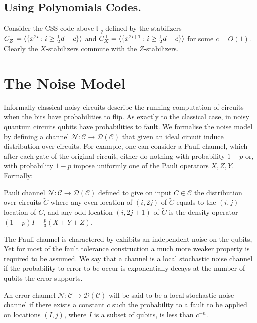 \documentclass[manuscript,screen,review]{acmart}
\begin{document}
{\subsection{Using Polynomials Codes.} Consider the CSS code above $\mathbb{F}_{q}$ defined by the stabilizers $C_{Z}^{\perp} = \braket{\{ x^{2i} : i\ge \frac{1}{2}d - c \}}$ and $C_{X}^{\perp} = \braket{\{ x^{2i+1} : i \ge \frac{1}{2}d - c \}}$ for some $c = O(1)$. Clearly the $X$-stabilizers commute with the $Z$-stabilizers. 



\section{ The Noise Model } 
Informally classical noisy circuits describe the running computation of circuits when the bits have probabilities to flip. As exactly to the classical case, in noisy quantum circuits qubits have probabilities to fault. We formalise the noise model by defining a channel $\mathcal{N} : \mathcal{C} \rightarrow \mathcal{D}\left(\mathcal{C}\right)$ that given an ideal circuit induce distribution over circuits. For example, one can consider a Pauli channel, which  after each gate of the original circuit, either do nothing with probability $1-p$ or, with probability $1-p$ impose uniformly one of the Pauli operators $X,Z,Y$. Formally:  
\begin{definition}
  Pauli channel $\mathcal{N}: \mathcal{C}\rightarrow \mathcal{D} \left( \mathcal{C} \right)$ defined to give on input $C \in \mathcal{C}$ the distribution over circuits $\tilde{C}$ where any even location of $(i, 2j)$ of $\tilde{C}$ equals to the $(i,j)$ location of $C$, and any odd location $(i,2j+1)$ of $\tilde{C}$ is the density operator $(1-p) I + \frac{p}{3} \left(X + Y + Z  \right)$. 
\end{definition}

The Pauli channel is charactered by exhibits an independent noise on the qubits, Yet for most of the fault tolerance construction a much more weaker property is required to be assumed. We say that a channel is a local stochastic noise channel if the probability to error to be occur is exponentially decays at the number of qubits the error supports.  
 
\begin{definition}
  An error channel $\mathcal{N}: \mathcal{C}\rightarrow \mathcal{D} \left( \mathcal{C} \right)$ will be said to be a local stochastic noise channel if there exists a constant $c$ such the probability to a fault to be applied on locations $(I ,j)$, where $I$ is a subset of qubits, is less than $c^{-n}$.
\end{definition}

}
\end{document}
